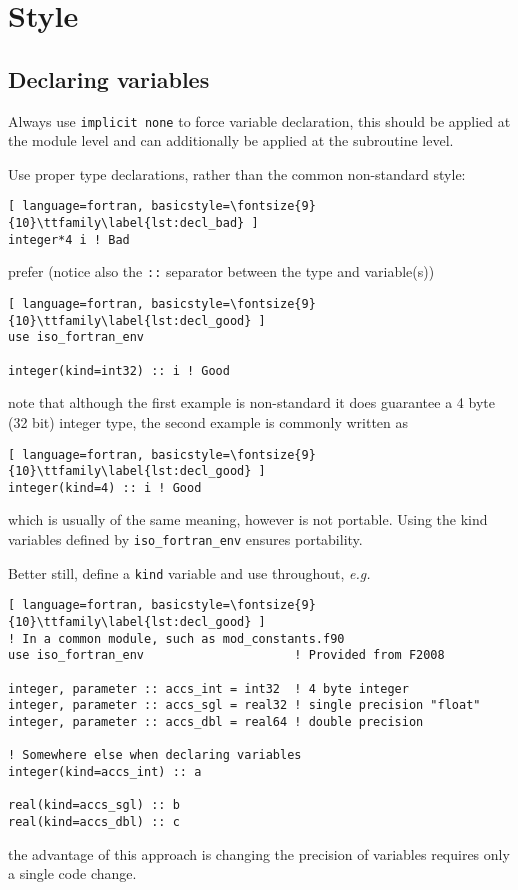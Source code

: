 \documentclass[11pt]{article}
\begin{document}
\section{Style}

\subsection{Declaring variables}
Always use \texttt{implicit none} to force variable declaration, this should be applied at the
module level and can additionally be applied at the subroutine level.

Use proper type declarations, rather than the common non-standard style:
\begin{lstlisting}[ language=fortran, basicstyle=\fontsize{9}{10}\ttfamily\label{lst:decl_bad} ]
integer*4 i ! Bad
\end{lstlisting}
prefer (notice also the \texttt{::} separator between the type and variable(s))
\begin{lstlisting}[ language=fortran, basicstyle=\fontsize{9}{10}\ttfamily\label{lst:decl_good} ]
use iso_fortran_env

integer(kind=int32) :: i ! Good
\end{lstlisting}
note that although the first example is non-standard it does guarantee a 4 byte (32 bit) integer
type, the second example is commonly written as
\begin{lstlisting}[ language=fortran, basicstyle=\fontsize{9}{10}\ttfamily\label{lst:decl_good} ]
integer(kind=4) :: i ! Good
\end{lstlisting}
which is usually of the same meaning, however is not portable. Using the kind variables defined by
\texttt{iso\_fortran\_env} ensures portability.

Better still, define a \texttt{kind} variable and use throughout, \textit{e.g.}
\begin{lstlisting}[ language=fortran, basicstyle=\fontsize{9}{10}\ttfamily\label{lst:decl_good} ]
! In a common module, such as mod_constants.f90
use iso_fortran_env                     ! Provided from F2008

integer, parameter :: accs_int = int32  ! 4 byte integer
integer, parameter :: accs_sgl = real32 ! single precision "float"
integer, parameter :: accs_dbl = real64 ! double precision

! Somewhere else when declaring variables
integer(kind=accs_int) :: a

real(kind=accs_sgl) :: b
real(kind=accs_dbl) :: c
\end{lstlisting}
the advantage of this approach is changing the precision of variables requires only a single code
change.
\end{document}
